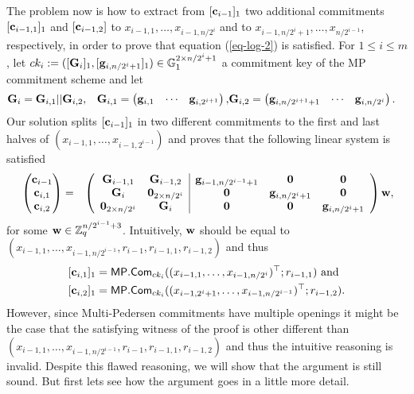 The problem now is how to extract from $[\mathbf{c}_{i-1}]_1$ two additional commitments $[\mathbf{c}_{i-1,1}]_1$ and $[\mathbf{c}_{i-1,2}]$ to $x_{i-1,1},\ldots,x_{i-1,n/2^i}$ and to $x_{i-1,n/2^i+1},\ldots,x_{n/2^{i-1}}$, respectively, in order to prove that equation (\ref{eq-log-2}) is satisfied. For $1\leq i \leq m$, let $ck_i:=([\mathbf{{G}}_i]_1,[\mathbf{g}_{i,n/2^i+1}]_1)\in\mathbb{G}_1^{2\times{n/2^i+1}}$ a commitment key of the MP commitment scheme and let
\begin{align*}
&\mathbf{{G}}_i=\mathbf{{G}}_{i,1}||\mathbf{{G}}_{i,2},
&\mathbf{{G}}_{i,1}=
\begin{pmatrix}
    \mathbf{g}_{i,1}&\cdots&\mathbf{g}_{i,2^{i+1}}
\end{pmatrix},
&\mathbf{{G}}_{i,2}=
\begin{pmatrix}
    \mathbf{g}_{i,n/2^{i+1}+1}&\cdots&\mathbf{g}_{i,n/2^i}
\end{pmatrix}.
\end{align*}
Our solution splits $[\mathbf{c}_{i-1}]_1$ in two different commitments to the first and last halves of $(x_{i-1,1},\ldots,x_{i-1,2^{i-1}})$ and proves that the following linear system is satisfied
{\begin{align}
&\begin{pmatrix}
\mathbf{c}_{i-1}\\
\mathbf{c}_{i,1}\\
\mathbf{c}_{i,2}
\end{pmatrix}
=
&\left(\begin{array}{cc|ccc}
\mathbf{{G}}_{i-1,1}         & \mathbf{{G}}_{i-1,2}         & \mathbf{g}_{i-1,n/2^{i-1}+1} & \mathbf{0}             & \mathbf{0}\\
\mathbf{{G}}_{i}             & \mathbf{{0}}_{2\times n/2^i} & \mathbf{0}                   & \mathbf{g}_{i,n/2^i+1} & \mathbf{0} \\
\mathbf{{0}}_{2\times n/2^i} & \mathbf{{G}}_{i}             & \mathbf{0}                   & \mathbf{0}             & \mathbf{g}_{i,n/2^i+1}
\end{array}\right)
\mathbf{w},\label{eq-log-split}
\end{align}}%
for some $\mathbf{w}\in\mathbb{Z}_q^{n/2^{i-1}+3}$.
Intuitively, $\mathbf{w}$ should be equal to $(x_{i-1,1},\ldots,x_{i-1,n/2^{i-1}},\allowbreak r_{i-1},r_{i-1,1},r_{i-1,2})$ and thus 
\begin{align*}
&[\mathbf{c}_{i,1}]_1=\mathsf{MP}.\mathsf{Com}_{ck_i}(\allowbreak(x_{i-1,1},\ldots,x_{i-1,n/2^{i}})^\top;r_{i-1,1})\text{ and }\\
&[\mathbf{c}_{i,2}]_1=\mathsf{MP}.\mathsf{Com}_{ck_i}((x_{i-1,2^i+1},\ldots, x_{i-1,n/2^{i-1}})^\top;r_{i-1,2}).
\end{align*}
However, since Multi-Pedersen commitments have multiple openings it might be the case that the satisfying witness of the proof is other different than $(x_{i-1,1},\ldots,x_{i-1,n/2^{i-1}},r_{i-1},r_{i-1,1},r_{i-1,2})$ and thus the intuitive reasoning is invalid.
Despite this flawed reasoning, we will show that the argument is still sound. But first lets see how the argument goes in a little more detail.

